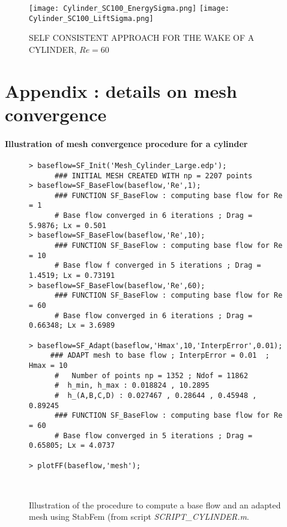 \documentclass[twocolumn,10pt]{asme2ej}
\begin{document}
\begin{figure}
\begin{center}
\texttt{[image: Cylinder\_SC100\_EnergySigma.png]}
\texttt{[image: Cylinder\_SC100\_LiftSigma.png]}
\end{center}
\caption{SELF CONSISTENT APPROACH FOR THE WAKE OF A CYLINDER, $Re = 60$}
\label{fig:SC60}
\end{figure}






\appendix

\section{Appendix : details on mesh convergence}


\paragraph{Illustration of mesh convergence procedure for a cylinder}

\begin{figure*}
\small
\begin{lstlisting}
> baseflow=SF_Init('Mesh_Cylinder_Large.edp');
      ### INITIAL MESH CREATED WITH np = 2207 points
> baseflow=SF_BaseFlow(baseflow,'Re',1);
      ### FUNCTION SF_BaseFlow : computing base flow for Re = 1
      # Base flow converged in 6 iterations ; Drag = 5.9876; Lx = 0.501
> baseflow=SF_BaseFlow(baseflow,'Re',10);
      ### FUNCTION SF_BaseFlow : computing base flow for Re = 10
      # Base flow f converged in 5 iterations ; Drag = 1.4519; Lx = 0.73191
> baseflow=SF_BaseFlow(baseflow,'Re',60);
      ### FUNCTION SF_BaseFlow : computing base flow for Re = 60
      # Base flow converged in 6 iterations ; Drag = 0.66348; Lx = 3.6989

> baseflow=SF_Adapt(baseflow,'Hmax',10,'InterpError',0.01);
     ### ADAPT mesh to base flow ; InterpError = 0.01  ; Hmax = 10
      #   Number of points np = 1352 ; Ndof = 11862
      #  h_min, h_max : 0.018824 , 10.2895
      #  h_(A,B,C,D) : 0.027467 , 0.28644 , 0.45948 , 0.89245
      ### FUNCTION SF_BaseFlow : computing base flow for Re = 60
      # Base flow converged in 5 iterations ; Drag = 0.65805; Lx = 4.0737

> plotFF(baseflow,'mesh');



\end{lstlisting}
\normalsize

\caption{Illustration of the procedure to compute a base flow and an adapted mesh using StabFem (from script {\em SCRIPT\_CYLINDER.m}. }
\end{figure*}
\end{document}
